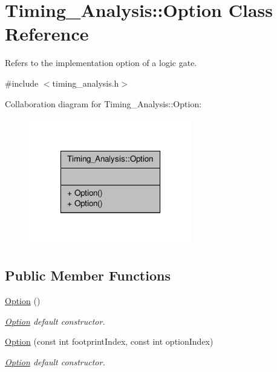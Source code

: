 \hypertarget{classTiming__Analysis_1_1Option}{\section{Timing\-\_\-\-Analysis\-:\-:Option Class Reference}
\label{classTiming__Analysis_1_1Option}
}


Refers to the implementation option of a logic gate.  




{\ttfamily \#include $<$timing\-\_\-analysis.\-h$>$}



Collaboration diagram for Timing\-\_\-\-Analysis\-:\-:Option\-:\nopagebreak
\begin{figure}[H]
\begin{center}
\leavevmode
\includegraphics[width=202pt]{classTiming__Analysis_1_1Option__coll__graph}
\end{center}
\end{figure}
\subsection*{Public Member Functions}
\begin{DoxyCompactItemize}
\item 
\hyperlink{classTiming__Analysis_1_1Option_ac426169d74c9d432f168255b6cb52544}{Option} ()
\begin{DoxyCompactList}\small\item\em \hyperlink{classTiming__Analysis_1_1Option}{Option} default constructor. \end{DoxyCompactList}\item 
\hyperlink{classTiming__Analysis_1_1Option_a1d95559d49ea714e293a8679cefe8295}{Option} (const int footprint\-Index, const int option\-Index)
\begin{DoxyCompactList}\small\item\em \hyperlink{classTiming__Analysis_1_1Option}{Option} default constructor. \end{DoxyCompactList}\end{DoxyCompactItemize}
